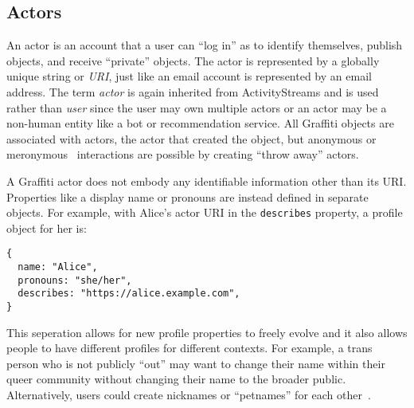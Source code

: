 \subsection{Actors}

An actor is an account that a user can ``log in'' as
to identify themselves, publish objects, and receive ``private'' objects.
The actor is represented by a globally unique string or \emph{URI},
just like an email account is represented by an email address.
The term \emph{actor} is again inherited from ActivityStreams
and is used rather than \emph{user} since the user may own
multiple actors or
an actor may be a non-human entity
like a bot or recommendation service.
All Graffiti objects are associated with actors, the actor
that created the object, but anonymous
or meronymous~\cite{meronymous} interactions are possible by
creating ``throw away'' actors.




A Graffiti actor does not embody any identifiable information other than its
URI.
Properties like a display name or pronouns are instead
defined in separate objects.
For example, with Alice's actor URI in the \texttt{describes}
property, a profile object for her is:
\begin{verbatim}
{
  name: "Alice",
  pronouns: "she/her",
  describes: "https://alice.example.com",
}
\end{verbatim}
This seperation allows for new profile
properties to freely evolve
and it also allows people to have different profiles for different contexts.
For example, a trans person who is not publicly ``out'' may want to
change their name within their queer community without
changing their name to the broader public.
Alternatively, users could create nicknames
or ``petnames'' for each other~\cite{petnames}.

